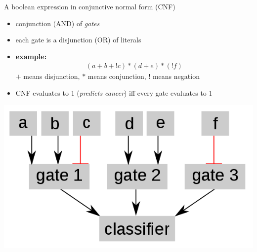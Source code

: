 \documentclass[10pt,dvipsnames]{beamer}
\begin{document}
\begin{frame}{A boolean expression in conjunctive normal form (CNF)}
\begin{itemize}
\item conjunction (AND) of \emph{gates}
\item each gate is a disjunction (OR) of literals
\item \textbf{example:}  
\begin{align*}
(a + b + !c) * (d + e) * (!f)
\end{align*}
{\small $+$ means disjunction, $*$ means conjunction, $!$ means negation}
\vspace{0.2cm}
\item CNF evaluates to 1 (\emph{predicts cancer}) iff every gate evaluates to 1
\end{itemize}
\vspace{0.2cm}
\begin{center}
\includegraphics[scale=0.25]{classifier_exp.png}
\end{center}
\end{frame}
\end{document}
